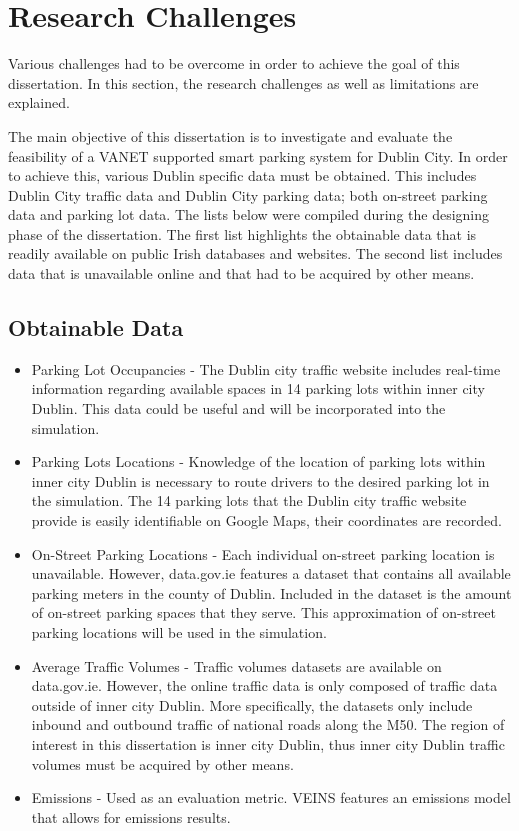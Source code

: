 \section{Research Challenges}
Various challenges had to be overcome in order to achieve the goal of this dissertation. In this section, the research challenges as well as limitations are explained.

The main objective of this dissertation is to investigate and evaluate the feasibility of a \ac{VANET} supported smart parking system for Dublin City. In order to achieve this, various Dublin specific data must be obtained. This includes Dublin City traffic data and Dublin City parking data; both on-street parking data and parking lot data. The lists below were compiled during the designing phase of the dissertation. The first list highlights the obtainable data that is readily available on public Irish databases and websites. The second list includes data that is unavailable online and that had to be acquired by other means.

\subsection*{Obtainable Data}
\begin{itemize}
    \item Parking Lot Occupancies - The Dublin city traffic website includes real-time information regarding available spaces in 14 parking lots within inner city Dublin. This data could be useful and will be incorporated into the simulation.
    \item Parking Lots Locations - Knowledge of the location of parking lots within inner city Dublin is necessary to route drivers to the desired parking lot in the simulation. The 14 parking lots that the Dublin city traffic website provide is easily identifiable on Google Maps, their coordinates are recorded.
    \item On-Street Parking Locations - Each individual on-street parking location is unavailable. However, data.gov.ie features a dataset that contains all available parking meters in the county of Dublin. Included in the dataset is the amount of on-street parking spaces that they serve. This approximation of on-street parking locations will be used in the simulation.
    \item Average Traffic Volumes - Traffic volumes datasets are available on data.gov.ie. However, the online traffic data is only composed of traffic data outside of inner city Dublin. More specifically, the datasets only include inbound and outbound traffic of national roads along the M50. The region of interest in this dissertation is inner city Dublin, thus inner city Dublin traffic volumes must be acquired by other means.
    \item Emissions - Used as an evaluation metric. \ac{VEINS} features an emissions model that allows for emissions results.
\end{itemize}

